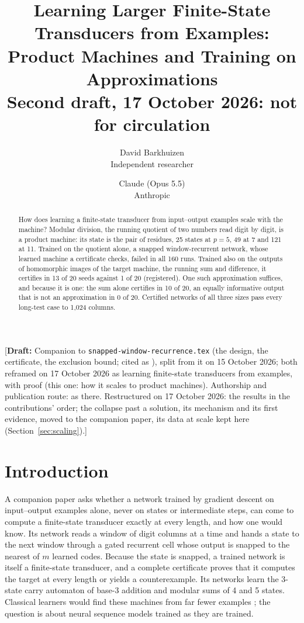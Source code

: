 \documentclass[11pt]{article}
\title{Learning Larger Finite-State Transducers from Examples:\\Product Machines and Training on
Approximations\\[0.5em]
\large Second draft, 17 October 2026: not for circulation}
\author{
  David Barkhuizen\\
  Independent researcher
  \and
  Claude (Opus 5.5)\\
  Anthropic
}
\date{}
\newcommand{\draftnote}[1]{\textcolor{red!70!black}{[\textbf{Draft:} #1]}}
\begin{document}
\maketitle

\draftnote{Companion to \texttt{snapped-window-recurrence.tex} (the design, the certificate, the
exclusion bound; cited as \citep{barkhuizen-2026-snapped-window-recurrence}), split from it on 15
October 2026; both reframed on 17 October 2026 as learning finite-state transducers from examples,
with proof (this one: how it scales to product machines).
Authorship and publication route: as there. Restructured on 17 October 2026: the results in the
contributions' order; the collapse past a solution, its mechanism and its first evidence, moved to
the companion paper, its data at scale kept here (Section~\ref{sec:scaling}).}

\begin{abstract}
How does learning a finite-state transducer from input--output examples scale with the machine?
Modular division, the running quotient of two numbers read digit by digit, is a product machine:
its state is the pair of residues, 25 states at $p = 5$, 49 at 7 and 121 at 11. Trained on the
quotient alone, a snapped window-recurrent network, whose learned machine a certificate checks,
failed in all 160 runs. Trained also on the outputs of homomorphic images of the target machine, the running sum
and difference, it certifies in 13 of 20 seeds against 1 of 20 (registered). One such approximation
suffices, and because it is one: the sum alone certifies in 10 of 20, an equally informative output
that is not an approximation in 0 of 20. Certified networks of all three sizes pass every long-test case to
1{,}024 columns.
\end{abstract}

\section{Introduction}

A companion paper \citep{barkhuizen-2026-snapped-window-recurrence} asks whether a network trained
by gradient descent on input--output examples alone, never on states or intermediate steps, can
come to compute a finite-state transducer exactly at every length, and how one would know. Its
network reads a window of digit columns at a time and hands a state to the next window through a
gated recurrent cell whose output is snapped to the nearest of $m$ learned codes. Because the state
is snapped, a trained network is itself a finite-state transducer, and a complete certificate
proves that it computes the target at every length or yields a counterexample. Its networks learn
the 3-state carry automaton of base-3 addition and modular sums of 4 and 5 states. Classical
learners would find these machines from far fewer examples
\citep{oncina-1992-transducer-learning-pattern-recognition}; the question is about neural sequence
models trained as they are trained.
\end{document}
